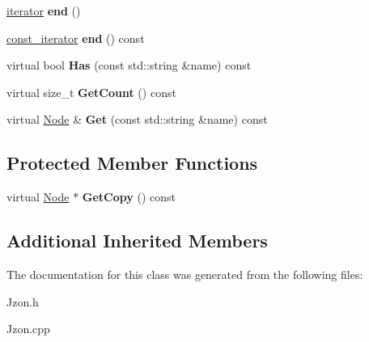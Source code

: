 \begin{DoxyCompactItemize}
\item 
\hypertarget{class_jzon_1_1_object_a294ecc467022f720e7377a0a509738bb}{\hyperlink{class_jzon_1_1_object_1_1iterator}{iterator} {\bfseries end} ()}\label{class_jzon_1_1_object_a294ecc467022f720e7377a0a509738bb}

\item 
\hypertarget{class_jzon_1_1_object_a44077e96e885dc470ba5eed7356be42a}{\hyperlink{class_jzon_1_1_object_1_1const__iterator}{const\-\_\-iterator} {\bfseries end} () const }\label{class_jzon_1_1_object_a44077e96e885dc470ba5eed7356be42a}

\item 
\hypertarget{class_jzon_1_1_object_aaf903fd38759cda5c1aa7e626ac8015b}{virtual bool {\bfseries Has} (const std\-::string \&name) const }\label{class_jzon_1_1_object_aaf903fd38759cda5c1aa7e626ac8015b}

\item 
\hypertarget{class_jzon_1_1_object_a5d5ce0af633ace9dbab2fbf41ff9cba5}{virtual size\-\_\-t {\bfseries Get\-Count} () const }\label{class_jzon_1_1_object_a5d5ce0af633ace9dbab2fbf41ff9cba5}

\item 
\hypertarget{class_jzon_1_1_object_aa040339365c26fc93ade6258ba31b6c0}{virtual \hyperlink{class_jzon_1_1_node}{Node} \& {\bfseries Get} (const std\-::string \&name) const }\label{class_jzon_1_1_object_aa040339365c26fc93ade6258ba31b6c0}

\end{DoxyCompactItemize}
\subsection*{Protected Member Functions}
\begin{DoxyCompactItemize}
\item 
\hypertarget{class_jzon_1_1_object_a7eb4ae002d0a4295d365eec168ff07da}{virtual \hyperlink{class_jzon_1_1_node}{Node} $\ast$ {\bfseries Get\-Copy} () const }\label{class_jzon_1_1_object_a7eb4ae002d0a4295d365eec168ff07da}

\end{DoxyCompactItemize}
\subsection*{Additional Inherited Members}


The documentation for this class was generated from the following files\-:\begin{DoxyCompactItemize}
\item 
Jzon.\-h\item 
Jzon.\-cpp\end{DoxyCompactItemize}
